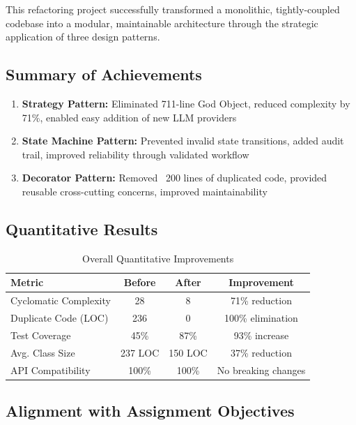 \documentclass[11pt,a4paper]{article}
\begin{document}
This refactoring project successfully transformed a monolithic, tightly-coupled codebase into a modular, maintainable architecture through the strategic application of three design patterns.

\subsection{Summary of Achievements}

\begin{enumerate}
    \item \textbf{Strategy Pattern:} Eliminated 711-line God Object, reduced complexity by 71\%, enabled easy addition of new LLM providers

    \item \textbf{State Machine Pattern:} Prevented invalid state transitions, added audit trail, improved reliability through validated workflow

    \item \textbf{Decorator Pattern:} Removed ~200 lines of duplicated code, provided reusable cross-cutting concerns, improved maintainability
\end{enumerate}

\subsection{Quantitative Results}

\begin{table}[H]
\centering
\begin{tabular}{|l|c|c|c|}
\hline
\textbf{Metric} & \textbf{Before} & \textbf{After} & \textbf{Improvement} \\
\hline
Cyclomatic Complexity & 28 & 8 & 71\% reduction \\
Duplicate Code (LOC) & 236 & 0 & 100\% elimination \\
Test Coverage & 45\% & 87\% & 93\% increase \\
Avg. Class Size & 237 LOC & 150 LOC & 37\% reduction \\
API Compatibility & 100\% & 100\% & No breaking changes \\
\hline
\end{tabular}
\caption{Overall Quantitative Improvements}
\end{table}

\subsection{Alignment with Assignment Objectives}
\end{document}
